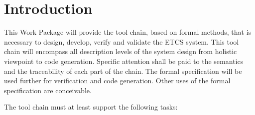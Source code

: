 \documentclass{template/openetcs_article}
\begin{document}
\maketitle
\tableofcontents
\newpage








\setlength{\marginparwidth}{1in}
\let\oldmarginpar\marginpar
\renewcommand\marginpar[1]{\-\oldmarginpar[\raggedleft\scriptsize #1]%
{\raggedright\scriptsize #1}}

\newcommand{\oldtext}[1]{{Old: \scriptsize #1}}

\newenvironment{inoutput}
{\vspace{2mm}
\noindent
\begin{tabular}{|r|p{.68\linewidth}|l|}
\hline}
{
\hline
\end{tabular}}

\section*{Introduction}

This Work Package will provide the tool chain, based on formal methods, that is necessary to
design, develop, verify and validate the ETCS system. This tool chain will encompass all description levels of the system design from holistic viewpoint to code generation. Specific attention shall be paid to the semantics and the traceability of each part of the chain. The formal specification will be used further for verification and code generation.  Other uses of the formal specification are conceivable.

The tool chain must at least support the following tasks:
\end{document}
